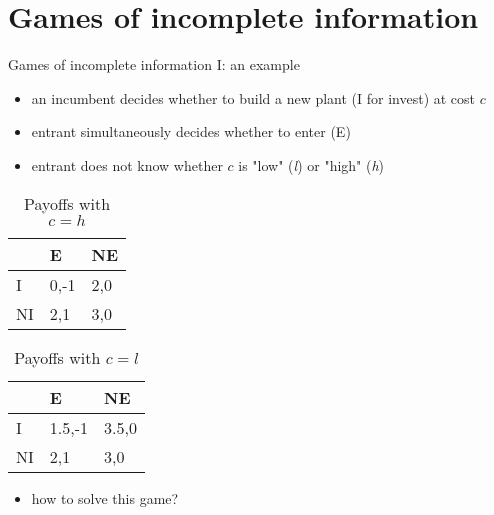 \documentclass[bigger]{beamer}
\begin{document}
\section{Games of incomplete information}
\label{sec:org2658cef}
\begin{frame}[label={sec:org8b5aa18}]{Games of incomplete information I: an example}
\begin{itemize}
\item an incumbent decides whether to build a new plant (I for invest)  at cost \(c\)
\item entrant simultaneously decides whether to enter (E)
\item entrant does not know whether \(c\) is "low" (\emph{l}) or "high" (\emph{h})
\end{itemize}

\begin{table}[htbp]
\caption{Payoffs with \(c=h\)}
\centering
\begin{tabular}{l|ll}
 & E & NE\\
\hline
I & 0,-1 & 2,0\\
NI & 2,1 & 3,0\\
\end{tabular}
\end{table}
\begin{table}[htbp]
\caption{Payoffs with \(c=l\)}
\centering
\begin{tabular}{l|ll}
 & E & NE\\
\hline
I & 1.5,-1 & 3.5,0\\
NI & 2,1 & 3,0\\
\end{tabular}
\end{table}

\begin{itemize}
\item how to solve this game?
\end{itemize}
\end{frame}
\end{document}
